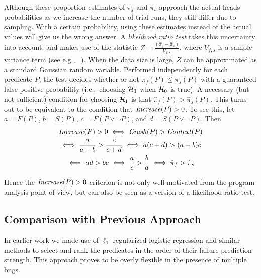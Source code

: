 Although these proportion estimates of $\pi_f$ and $\pi_s$ approach the
actual heads probabilities as we increase the number of trial runs, they
still differ due to sampling.  With a certain probability, using these
estimates instead of the actual values will give us the wrong
answer.  A \textit{likelihood ratio test} takes this uncertainty into
account, and makes use of the statistic $ Z = \frac{(\hat \pi_f - \hat
  \pi_s)}{V_{f,s}}$, where $V_{f,s}$ is a sample variance term (see
e.g., ~\cite{Lehmann:1986:hyptest}).  When
the data size is large, $Z$ can be approximated as a standard Gaussian
random variable.  Performed independently for each predicate $P$, the
test decides whether or not $\pi_f(P) \leq \pi_s(P)$ with a guaranteed
false-positive probability (i.e.,\ choosing ${\mathcal{H}}_1$ when ${\mathcal{H}}_0$ is true).
A necessary (but not sufficient) condition for choosing ${\mathcal{H}}_1$ is that
$\hat \pi_f(P) > \hat \pi_s(P)$.  This turns out to be
equivalent to the condition that $\mbox{\textit{Increase}}(P) > 0$.  To see this,
let $a = F(P)$, $b = S(P)$, $c = F(P\lor\lnot P)$, and $d = S(P\lor\lnot P)$.
Then
\begin{gather*}
  \mbox{\textit{Increase}}(P) > 0 \iff \mbox{\textit{Crash}}(P) > \mbox{\textit{Context}}(P) \\
  \iff \frac{a}{a+b} > \frac{c}{c+d}
  \iff a (c+d) > (a+b) c \\
  \iff ad > bc \iff \frac{a}{c} > \frac{b}{d}
  \iff \hat \pi_f > \hat \pi_s
\end{gather*}

Hence the $\mbox{\textit{Increase}}(P) > 0$ criterion is not only well motivated
from the program analysis point of view, but can also be seen as a
version of a likelihood ratio test.

\subsection{Comparison with Previous Approach}
In earlier work \cite{PLDI`03*141,Zheng:2003:SDSP}
we made use of $\ell_1$-regularized logistic regression and similar
methods to select and rank the predicates in the order of their
failure-prediction strength.  This approach proves to be
overly flexible in the presence of multiple bugs.

